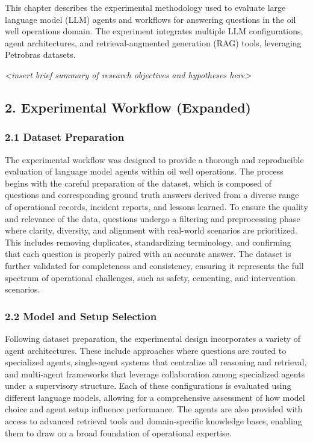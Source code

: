             This chapter describes the experimental methodology used to evaluate large language model (LLM) agents and workflows for answering questions in the oil well operations domain. The experiment integrates multiple LLM configurations, agent architectures, and retrieval-augmented generation (RAG) tools, leveraging Petrobras datasets.

            \textit{<insert brief summary of research objectives and hypotheses here>}

        \subsection{2. Experimental Workflow (Expanded)}

            \subsubsection{2.1 Dataset Preparation}

            The experimental workflow was designed to provide a thorough and reproducible evaluation of language model agents within oil well operations. The process begins with the careful preparation of the dataset, which is composed of questions and corresponding ground truth answers derived from a diverse range of operational records, incident reports, and lessons learned. To ensure the quality and relevance of the data, questions undergo a filtering and preprocessing phase where clarity, diversity, and alignment with real-world scenarios are prioritized. This includes removing duplicates, standardizing terminology, and confirming that each question is properly paired with an accurate answer. The dataset is further validated for completeness and consistency, ensuring it represents the full spectrum of operational challenges, such as safety, cementing, and intervention scenarios.

            \subsubsection{2.2 Model and Setup Selection}

            Following dataset preparation, the experimental design incorporates a variety of agent architectures. These include approaches where questions are routed to specialized agents, single-agent systems that centralize all reasoning and retrieval, and multi-agent frameworks that leverage collaboration among specialized agents under a supervisory structure. Each of these configurations is evaluated using different language models, allowing for a comprehensive assessment of how model choice and agent setup influence performance. The agents are also provided with access to advanced retrieval tools and domain-specific knowledge bases, enabling them to draw on a broad foundation of operational expertise.

